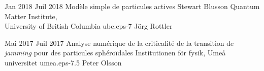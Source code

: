 \documentclass[letterpaper]{cvtemplate_fr} %
\begin{document}
\begin{cvbody}
\cvitem
	{Jan 2018}
	{Juil 2018}
	{Mod\`ele simple de particules actives}
  {Stewart Blusson Quantum Matter Institute,\\ University of British Columbia }
  {ubc.eps}{}{-7}
  {J\"org Rottler}
  {\\
  }

\cvitem
	{Mai 2017}
	{Juil 2017}
	{Analyse num\'erique de la criticalit\'e de la transition de \textit{jamming} pour des particules sph\'ero\"idales}
	{Institutionen f\"{o}r fysik, Ume\r{a} universitet }
	{umea.eps}{}{-7.5}
	{Peter Olsson}
	{\\
	}


\end{cvbody}
\end{document}

